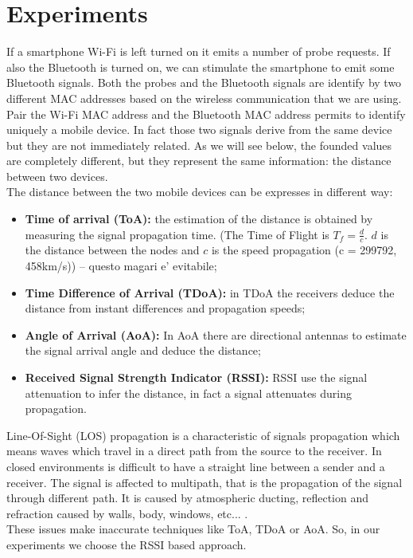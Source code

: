 \chapter{Experiments}
\label{capitolo5}
\thispagestyle{empty}
If a smartphone Wi-Fi is left turned on it emits a number of probe requests. If also the Bluetooth is turned on, we can stimulate the smartphone to emit some Bluetooth signals. Both the probes and the Bluetooth signals are identify by two different MAC addresses based on the wireless communication that we are using.\\
Pair the Wi-Fi MAC address and the Bluetooth MAC address permits to identify uniquely a mobile device. In fact those two signals derive from the same device but they are not immediately related. As we will see below, the founded values are completely different, but they represent the same information: the distance between two devices.\\
\linebreak
The distance between the two mobile devices can be expresses in different way:
\begin{itemize}
\item \textbf{Time of arrival (ToA):} the estimation of the distance is obtained by measuring the signal propagation time. (The Time of Flight is \(T_f = \frac{d}{c}\). \(d\) is the distance between the nodes and \(c\) is the speed propagation (c = 299792, 458km/s)) -- questo magari e' evitabile;
\item \textbf{Time Difference of Arrival (TDoA):} in TDoA the receivers deduce the distance from instant differences and propagation speeds;
\item \textbf{Angle of Arrival (AoA):} In AoA there are directional antennas to estimate the signal arrival angle and deduce the distance;
\item \textbf{Received Signal Strength Indicator (RSSI):} RSSI use the signal attenuation to infer the distance, in fact a signal attenuates during propagation.
\end{itemize}
Line-Of-Sight (LOS) propagation is a characteristic of signals propagation which means waves which travel in a direct path from the source to the receiver. In closed environments is difficult to have a straight line between a sender and a receiver. The signal is affected to multipath, that is the propagation of the signal through different path. It is caused by atmospheric ducting, reflection and refraction caused by walls, body, windows, etc... .\\
These issues make inaccurate techniques like ToA, TDoA or AoA. So, in our experiments we choose the RSSI based approach.\\

